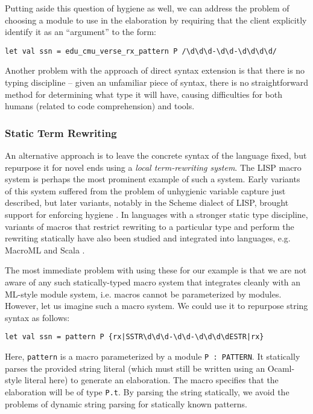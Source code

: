 Putting aside this question of hygiene as well, we can address the problem of choosing a module to use in the elaboration by requiring that the client explicitly identify it as an ``argument'' to the form:
\begin{lstlisting}[numbers=none]
let val ssn = edu_cmu_verse_rx_pattern P /\d\d\d-\d\d-\d\d\d\d/
\end{lstlisting}

Another problem with the approach of direct syntax extension is that there is no typing discipline -- given an unfamiliar piece of syntax, there is no straightforward method for determining what type it will have, causing difficulties for both humans (related to code comprehension) and tools.

\subsubsection{Static Term Rewriting}\label{sec:term-rewriting}
An alternative approach is to leave the concrete syntax of the language fixed, but repurpose it for novel ends using a \emph{local term-rewriting system}. The LISP macro system \cite{Hart63a} is perhaps the most prominent example of such a system. Early variants of this system suffered from the problem of unhygienic variable capture just described, but  later variants, notably in the Scheme dialect of LISP, brought support for enforcing hygiene \cite{Kohlbecker86a}. In languages with a stronger static type discipline, variants of macros that restrict rewriting to a particular type and perform the rewriting statically have also been studied \cite{Herman10:Theory,ganz2001macros} and integrated into languages, e.g. MacroML \cite{ganz2001macros} and Scala \cite{ScalaMacros2013}. 

The most immediate problem with using these for our example is that we are not aware of any such statically-typed macro system that integrates cleanly with an ML-style module system, i.e. macros cannot be parameterized by modules. However, let us imagine such a macro system. We could use it to repurpose string syntax  as follows:
\begin{lstlisting}[numbers=none]
let val ssn = pattern P {rx|SSTR\d\d\d-\d\d-\d\d\d\dESTR|rx}
\end{lstlisting}

Here, \lstinline{pattern} is a macro parameterized by a module \lstinline{P : PATTERN}. It statically parses the provided string literal (which must still be written using an Ocaml-style literal here) to generate an elaboration. The macro specifies that the elaboration will be of type \lstinline{P.t}. 
By parsing the string statically, we avoid the problems of dynamic string parsing for statically known patterns. 

